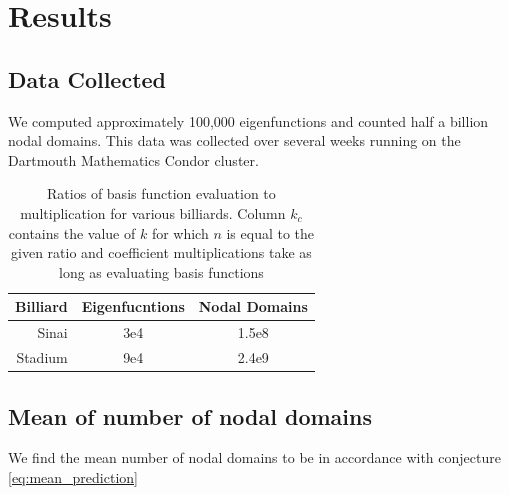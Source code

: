 \documentclass{report}
\begin{document}
\chapter{Results}

\section{Data Collected}
We computed approximately 100,000 eigenfunctions and counted half a billion nodal domains. This data was collected over several weeks running on the Dartmouth Mathematics Condor cluster.

\begin{table}
  \centering
  \begin{tabular}{|r|c|c|}
    \hline
    Billiard & Eigenfucntions & Nodal Domains \\ \hline
    \hline
    Sinai & 3e4 & 1.5e8 \\ \hline
    Stadium & 9e4 & 2.4e9 \\
    \hline
  \end{tabular}
  \caption{Ratios of basis function evaluation to multiplication for various billiards. Column $k_c$ contains the value of $k$ for which $n$ is equal to the given ratio and coefficient multiplications take as long as evaluating basis functions}
  \label{tab:results_summary}
\end{table}

\section{Mean of number of nodal domains}
We find the mean number of nodal domains to be in accordance with conjecture \ref{eq:mean_prediction}

\end{document}

